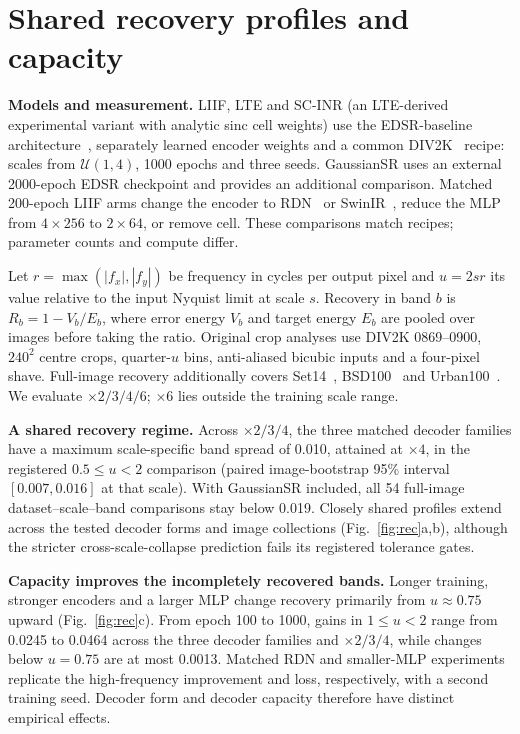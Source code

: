 \documentclass{article}
\begin{document}
\section{Shared recovery profiles and capacity}
\label{sec:u}
\textbf{Models and measurement.} LIIF, LTE and SC-INR (an LTE-derived experimental variant with analytic sinc cell weights) use the EDSR-baseline architecture~\cite{lim2017edsr}, separately learned encoder weights and a common DIV2K~\cite{agustsson2017div2k} recipe: scales from $\mathcal U(1,4)$, 1000 epochs and three seeds. GaussianSR uses an external 2000-epoch EDSR checkpoint and provides an additional comparison. Matched 200-epoch LIIF arms change the encoder to RDN~\cite{zhang2018rdn} or SwinIR~\cite{liang2021swinir}, reduce the MLP from $4\times256$ to $2\times64$, or remove cell. These comparisons match recipes; parameter counts and compute differ.

Let $r=\max(|f_x|,|f_y|)$ be frequency in cycles per output pixel and $u=2sr$ its value relative to the input Nyquist limit at scale $s$. Recovery in band $b$ is $R_b=1-V_b/E_b$, where error energy $V_b$ and target energy $E_b$ are pooled over images before taking the ratio. Original crop analyses use DIV2K 0869--0900, $240^2$ centre crops, quarter-$u$ bins, anti-aliased bicubic inputs and a four-pixel shave. Full-image recovery additionally covers Set14~\cite{zeyde2010single}, BSD100~\cite{martin2001database} and Urban100~\cite{huang2015urban}. We evaluate $\times2/3/4/6$; $\times6$ lies outside the training scale range.

\textbf{A shared recovery regime.} Across $\times2/3/4$, the three matched decoder families have a maximum scale-specific band spread of 0.010, attained at $\times4$, in the registered $0.5\le u<2$ comparison (paired image-bootstrap 95\% interval $[0.007,0.016]$ at that scale). With GaussianSR included, all 54 full-image dataset--scale--band comparisons stay below 0.019. Closely shared profiles extend across the tested decoder forms and image collections (Fig.~\ref{fig:rec}a,b), although the stricter cross-scale-collapse prediction fails its registered tolerance gates.

\textbf{Capacity improves the incompletely recovered bands.} Longer training, stronger encoders and a larger MLP change recovery primarily from $u\approx0.75$ upward (Fig.~\ref{fig:rec}c). From epoch 100 to 1000, gains in $1\le u<2$ range from 0.0245 to 0.0464 across the three decoder families and $\times2/3/4$, while changes below $u=0.75$ are at most 0.0013. Matched RDN and smaller-MLP experiments replicate the high-frequency improvement and loss, respectively, with a second training seed. Decoder form and decoder capacity therefore have distinct empirical effects.
\end{document}

